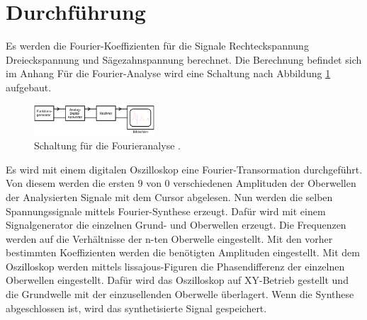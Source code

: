\section{Durchführung}
\label{sec:Durchführung}
Es werden die Fourier-Koeffizienten für die Signale Rechteckspannung
Dreieckspannung und Sägezahnspannung berechnet. Die Berechnung befindet sich im
Anhang
Für die Fourier-Analyse wird eine Schaltung nach Abbildung \ref{fig:Analyseschaltung} aufgebaut.
\begin{figure}
  \centering
  \includegraphics[width=0.4\textwidth]{Analyseschaltung.png}
  \caption{Schaltung für die Fourieranalyse \cite{sample}.}
  \label{fig:Analyseschaltung}
\end{figure}
Es wird mit einem digitalen Oszilloskop eine Fourier-Transormation durchgeführt.
Von diesem werden die ersten $9$ von $0$ verschiedenen Amplituden der Oberwellen
der Analysierten Signale mit dem Cursor abgelesen.
Nun werden die selben Spannungssignale mittels Fourier-Synthese erzeugt. Dafür
wird mit einem Signalgenerator die einzelnen Grund- und Oberwellen erzeugt. Die
Frequenzen werden auf die Verhältnisse der n-ten Oberwelle eingestellt.
Mit den vorher bestimmten Koeffizienten werden die benötigten Amplituden
eingestellt. Mit dem Oszilloskop werden mittels lissajous-Figuren die
Phasendifferenz der einzelnen Oberwellen eingestellt. Dafür wird das Oszilloskop
auf XY-Betrieb gestellt und die Grundwelle mit der einzusellenden Oberwelle
überlagert. Wenn die Synthese abgeschlossen ist, wird das synthetisierte Signal
gespeichert.
